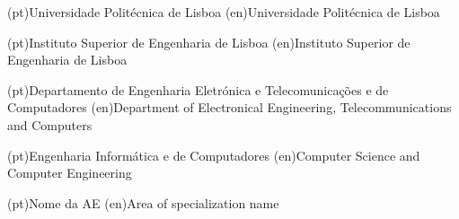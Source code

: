 
%



\ncuniversity*(pt){Universidade Politécnica de Lisboa}
\ncuniversity*(en){Universidade Politécnica de Lisboa}

\ncschool*(pt){Instituto Superior de Engenharia de Lisboa}
\ncschool*(en){Instituto Superior de Engenharia de Lisboa}

\ncdepartment*(pt){Departamento de Engenharia Eletrónica e Telecomunicações e de Computadores}
\ncdepartment*(en){Department of Electronical Engineering, Telecommunications and Computers}



\ncmajorfield(pt){Engenharia Informática e de Computadores}
\ncmajorfield(en){Computer Science and Computer Engineering}




\ncspecialization(pt){Nome da AE}
\ncspecialization(en){Area of specialization name}
